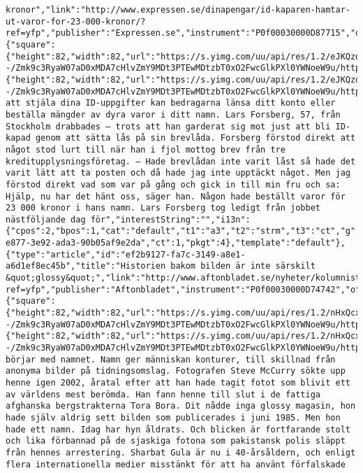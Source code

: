 \begin{verbatim}
kronor","link":"http://www.expressen.se/dinapengar/id-kaparen-hamtar-ut-varor-for-23-000-kronor/?ref=yfp","publisher":"Expressen.se","instrument":"P0f00030000D87715","off_network":true,"images":{"square":{"height":82,"width":82,"url":"https://s.yimg.com/uu/api/res/1.2/eJKQzd9SuQLQg56ayj9ZFg--/Zmk9c3RyaW07aD0xMDA7cHlvZmY9MDt3PTEwMDtzbT0xO2FwcGlkPXl0YWNoeW9u/http://slingstone.zenfs.com/offnetwork/e797faffebd05a0fcb799946f71185e5","defer":0}},"image":{"height":82,"width":82,"url":"https://s.yimg.com/uu/api/res/1.2/eJKQzd9SuQLQg56ayj9ZFg--/Zmk9c3RyaW07aD0xMDA7cHlvZmY9MDt3PTEwMDtzbT0xO2FwcGlkPXl0YWNoeW9u/http://slingstone.zenfs.com/offnetwork/e797faffebd05a0fcb799946f71185e5","defer":0},"summary":"Genom att stjäla dina ID-uppgifter kan bedragarna länsa ditt konto eller beställa mängder av dyra varor i ditt namn. Lars Forsberg, 57, från Stockholm drabbades – trots att han garderat sig mot just att bli ID-kapad genom att sätta lås på sin brevlåda. Forsberg förstod direkt att något stod lurt till när han i fjol mottog brev från tre kreditupplysningsföretag. – Hade brevlådan inte varit låst så hade det varit lätt att ta posten och då hade jag inte upptäckt något. Men jag förstod direkt vad som var på gång och gick in till min fru och sa: Hjälp, nu har det hänt oss, säger han. Någon hade beställt varor för 23 000 kronor i hans namn. Lars Forsberg tog ledigt från jobbet nästföljande dag för","interestString":"","i13n":{"cpos":2,"bpos":1,"cat":"default","t1":"a3","t2":"strm","t3":"ct","g":"0fa8b148-e877-3e92-ada3-90b05af9e2da","ct":1,"pkgt":4},"template":"default"},{"type":"article","id":"ef2b9127-fa7c-3149-a8e1-a6d1ef8ec45b","title":"Historien bakom bilden är inte särskilt &quot;glossy&quot;","link":"http://www.aftonbladet.se/nyheter/kolumnister/nataliakazmierska/article23800390.ab?ref=yfp","publisher":"Aftonbladet","instrument":"P0f00030000D74742","off_network":true,"images":{"square":{"height":82,"width":82,"url":"https://s.yimg.com/uu/api/res/1.2/nHxQcx9vQwwOVSHLDQrlHg--/Zmk9c3RyaW07aD0xMDA7cHlvZmY9MDt3PTEwMDtzbT0xO2FwcGlkPXl0YWNoeW9u/http://slingstone.zenfs.com/offnetwork/7e66af74a06a99ce003f2b155f9598b8","defer":0}},"image":{"height":82,"width":82,"url":"https://s.yimg.com/uu/api/res/1.2/nHxQcx9vQwwOVSHLDQrlHg--/Zmk9c3RyaW07aD0xMDA7cHlvZmY9MDt3PTEwMDtzbT0xO2FwcGlkPXl0YWNoeW9u/http://slingstone.zenfs.com/offnetwork/7e66af74a06a99ce003f2b155f9598b8","defer":0},"summary":"Vi börjar med namnet. Namn ger människan konturer, till skillnad från anonyma bilder på tidningsomslag. Fotografen Steve McCurry sökte upp henne igen 2002, åratal efter att han hade tagit fotot som blivit ett av världens mest berömda. Han fann henne till slut i de fattiga afghanska bergstrakterna Tora Bora. Dit nådde inga glossy magasin, hon hade själv aldrig sett bilden som publicerades i juni 1985. Men hon hade ett namn. Idag har hyn åldrats. Och blicken är fortfarande stolt och lika förbannad på de sjaskiga fotona som pakistansk polis släppt från hennes arrestering. Sharbat Gula är nu i 40-årsåldern, och enligt flera internationella medier misstänkt för att ha använt förfalskade 
\end{verbatim}
